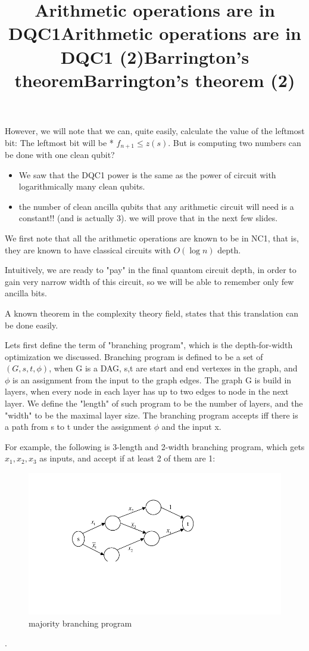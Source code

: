 \documentclass{article}
\begin{document}
However, we will note that we can, quite easily, calculate the value of the leftmost bit: The leftmost bit will be * \iff $f_{n+1} \leq z(s)$. But is computing two numbers can be done with one clean qubit?


\title{Arithmetic operations are in DQC1}
\begin{itemize}
\item We saw that the DQC1 power is the same as the power of circuit with logarithmically many clean qubits. 

\item the number of clean ancilla qubits that any arithmetic circuit will need is a constant!! (and is actually 3). we will prove that in the next few slides. 
\end{itemize}



\title{Arithmetic operations are in DQC1 (2)}
We first note that all the arithmetic operations are known to be in NC1, that is, they are known to have classical circuits with $O(\log{n})$ depth.

Intuitively, we are ready to "pay" in the final quantom circuit depth, in order to gain very narrow width of this circuit, so we will be able to remember only few ancilla bits.

A known theorem in the complexity theory field, states that this translation can be done easily. 



\title{Barrington's theorem}
Lets first define the term of "branching program", which is the depth-for-width optimization we discussed. Branching program is defined to be a set of $(G,s,t,\phi)$, when G is a DAG, s,t are start and end vertexes in the graph, and $\phi$ is an assignment from the input to the graph edges. The graph G is build in layers, when every node in each layer has up to two edges to node in the next layer. We define the "length" of such program to be the number of layers, and the "width" to be the maximal layer size. The branching program accepts iff there is a path from s to t under the assignment $\phi$ and the input x. 


\title{Barrington's theorem (2)}
For example, the following is 3-length and 2-width branching program, which gets $x_{1},x_{2},x_{3}$ as inputs, and accept if at least 2 of them are 1:
\begin{figure}
\includegraphics[scale=0.5]{majority} 
\caption{majority branching program}
\end{figure}.
\end{document}
